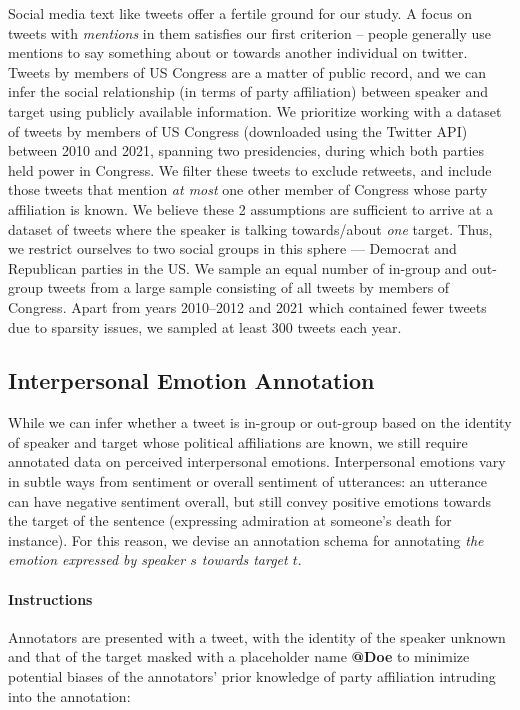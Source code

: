 Social media text like tweets offer a fertile ground for our study. A focus on tweets with \emph{mentions} in them satisfies our first criterion -- people generally use mentions to say something about or towards another individual on twitter. Tweets by members of US Congress are a matter of public record, and we can infer the social relationship (in terms of party affiliation) between speaker and target using publicly available information. We prioritize working with a dataset of tweets by members of US Congress (downloaded using the Twitter API) between 2010 and 2021, spanning two presidencies, during which both parties held power in Congress. We filter these tweets to exclude retweets, and include those tweets that mention \emph{at most} one other member of Congress whose party affiliation is known. We believe these 2 assumptions are sufficient to arrive at a dataset of tweets where the speaker is talking towards/about \emph{one} target. Thus, we restrict ourselves to two social groups in this sphere --- Democrat and Republican parties in the US. We sample an equal number of in-group and out-group tweets from a large sample consisting of all tweets by members of Congress. Apart from years 2010--2012 and 2021 which contained fewer tweets due to sparsity issues, we sampled at least 300 tweets each year.





\subsection{Interpersonal Emotion Annotation}
\label{subsec:twitter-annotation}

While we can infer whether a tweet is in-group or out-group based on the identity of speaker and target whose political affiliations are known, we still require annotated data on perceived interpersonal emotions. Interpersonal emotions vary in subtle ways from sentiment or overall sentiment of utterances: an utterance can have negative sentiment overall, but still convey positive emotions towards the target of the sentence (expressing admiration at someone's death for instance). For this reason, we devise an annotation schema for annotating \emph{the emotion expressed by speaker $s$ towards target $t$}.

\paragraph{Instructions} Annotators are presented with a tweet, with the identity of the speaker unknown and that of the target masked with a placeholder name \textbf{@Doe} to minimize potential biases of the annotators' prior knowledge of party affiliation intruding into the annotation:

